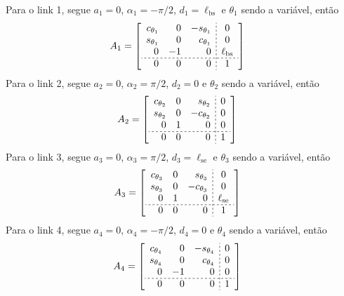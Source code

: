 Para o link 1, segue $a_1 = 0$, $\alpha_1 = -\pi/2$, $d_1=\ell_\mathrm{bs}$ e $\theta_1$ sendo a variável, então
\begin{align*}
    A_1 
    &=
    \left[ 
    \begin{array}{rrr;{2pt/2pt}c}
        c_{\theta_1} & 0 & -s_{\theta_1} & 0 \\
        s_{\theta_1} & 0 &  c_{\theta_1} & 0 \\
        0 & -1 & 0 & \ell_\mathrm{bs} \\
        \hdashline[2pt/2pt]
        0 & 0 & 0 & 1
    \end{array}
    \right]
\end{align*}
Para o link 2, segue $a_2 = 0$, $\alpha_2 = \pi/2$, $d_2=0$ e $\theta_2$ sendo a variável, então
\begin{align*}
    A_2 &=
    \left[ 
    \begin{array}{rrr;{2pt/2pt}c}
        c_{\theta_2} & 0 &  s_{\theta_2} & 0 \\
        s_{\theta_2} & 0 & -c_{\theta_2} & 0 \\
        0 & 1 & 0 &  0 \\
        \hdashline[2pt/2pt]
        0 & 0 & 0 & 1
    \end{array}
    \right]
\end{align*}
Para o link 3, segue $a_3 = 0$, $\alpha_3 = \pi/2$, $d_3=\ell_\mathrm{se}$ e $\theta_3$ sendo a variável, então
\begin{align*}
    A_3 &=
    \left[ 
    \begin{array}{rrr;{2pt/2pt}c}
        c_{\theta_3} & 0 &  s_{\theta_3} & 0 \\
        s_{\theta_3} & 0 & -c_{\theta_3} & 0 \\
        0 & 1 & 0 &  \ell_\mathrm{se} \\
        \hdashline[2pt/2pt]
        0 & 0 & 0 & 1
    \end{array}
    \right]
\end{align*}
Para o link 4, segue $a_4 = 0$, $\alpha_4 = -\pi/2$, $d_4=0$ e $\theta_4$ sendo a variável, então
\begin{align*}
    A_4 
    &=
    \left[ 
    \begin{array}{rrr;{2pt/2pt}c}
        c_{\theta_4} & 0 & -s_{\theta_4} & 0 \\
        s_{\theta_4} & 0 &  c_{\theta_4} & 0 \\
        0 & -1 & 0 & 0 \\
        \hdashline[2pt/2pt]
        0 & 0 & 0 & 1
    \end{array}
    \right]
\end{align*}

